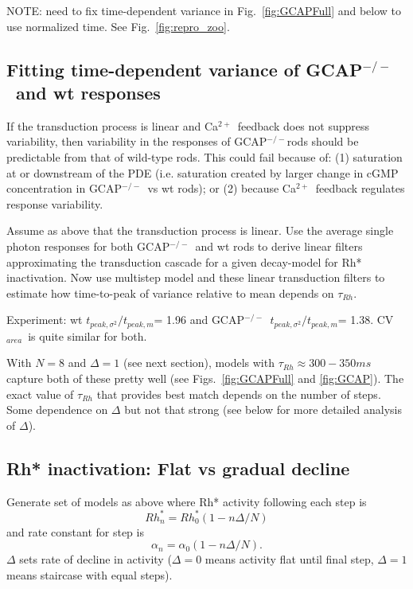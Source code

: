 \documentclass[12pt]{article}
\def\Ca{Ca$^{2+}$~}
\def\GCAPKO{GCAP$^{-/-}$}
\def\CVArea{CV$_{area}$~}
\def\tpeakratio{$t_{peak, \sigma^2} / t_{peak, m}$}
\begin{document}
NOTE: need to fix time-dependent variance in Fig.~\ref{fig:GCAPFull} and below to use normalized time.  See Fig.~\ref{fig:repro_zoo}.

\subsection{Fitting time-dependent variance of \GCAPKO~and wt responses}

If the transduction process is linear and \Ca feedback does not suppress variability, then variability in the responses of \GCAPKO rods should be predictable from that of wild-type rods.  This could fail because of: (1) saturation at or downstream of the PDE (i.e. saturation created by larger change in cGMP concentration in \GCAPKO~vs wt rods); or (2) because \Ca feedback regulates response variability.  

Assume as above that the transduction process is linear.  Use the average single photon responses for both \GCAPKO~and wt rods to derive linear filters approximating the transduction cascade for a given decay-model for Rh* inactivation.  Now use multistep model and these linear transduction filters to estimate how time-to-peak of variance relative to mean depends on $\tau_{Rh}$.  

Experiment:  wt \tpeakratio = 1.96 and \GCAPKO~\tpeakratio = 1.38.  \CVArea is quite similar for both.

With $N = 8$ and $\Delta = 1$ (see next section), models with $\tau_{Rh} \approx 300-350 ms$ capture both of these pretty well (see Figs.~\ref{fig:GCAPFull} and \ref{fig:GCAP}). The exact value of $\tau_{Rh}$ that provides best match depends on the number of steps.  Some dependence on $\Delta$ but not that strong (see below for more detailed analysis of $\Delta$).

\subsection{Rh* inactivation: Flat vs gradual decline}

Generate set of models as above where Rh* activity following each step is
\begin{equation}
Rh^*_n = Rh^*_0  (1 - n\Delta/N)
\end{equation}
and rate constant for step is
\begin{equation}
\alpha_n = \alpha_0  (1 - n\Delta/N).
\end{equation}
$\Delta$ sets rate of decline in activity ($\Delta = 0$ means activity flat until final step, $\Delta = 1$ means staircase with equal steps).  
\end{document}
